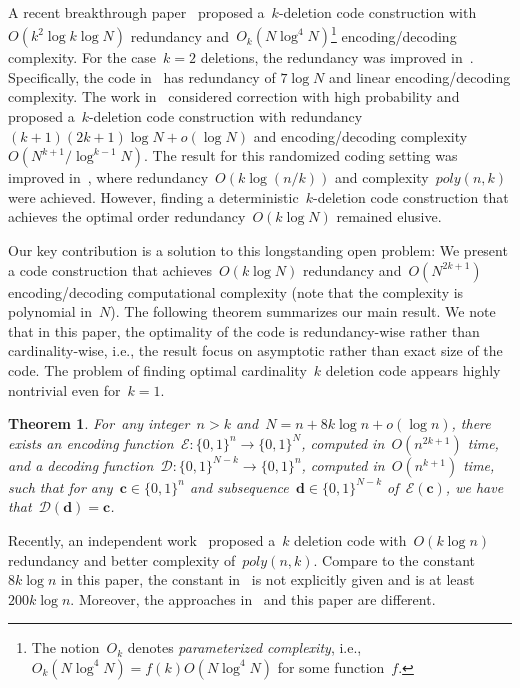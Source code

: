 \documentclass[10pt,a4paper,onecolumn]{IEEEtran}
\newtheorem{theorem}{Theorem}
\newcommand{\1}{\mathbbold{1}}
\newcommand{\boldc}{\mathbf{c}}
\newcommand{\boldd}{\mathbf{d}}
\begin{document}
A recent breakthrough paper~\cite{brakensiek2016efficient} proposed a~$k$-deletion code construction with~$O(k^2\log k \log N)$ redundancy and~$O_k(N\log^4 N)$\footnote{The notion~$O_k$ denotes \textit{parameterized complexity}, i.e., $O_k(N\log^4 N)=f(k)O(N\log^4 N)$ for some function~$f$.} encoding/decoding complexity. For the case~$k=2$ deletions, the redundancy was improved in~\cite{Ryan,sima2018two}. Specifically, the code in~\cite{sima2018two} has redundancy of $7\log N$ and linear encoding/decoding complexity. The work in~\cite{hanna2018guess} considered correction with high probability and proposed a~$k$-deletion code construction with redundancy~$(k+1)(2k+1)\log N + o(\log N)$ and encoding/decoding complexity~$O(N^{k+1}/\log^{k-1}N)$. The result for this randomized coding setting was improved in~\cite{Haeupler}, where redundancy~$O(k\log (n/k))$ and complexity~$poly(n,k)$ were achieved. However, finding a deterministic~$k$-deletion code construction that achieves the optimal order redundancy~$O(k\log N)$ remained elusive. 

Our key contribution is a solution to this longstanding open problem: We present a code construction that achieves~$O(k\log N)$ redundancy and~$O(N^{2k+1})$ encoding/decoding computational complexity (note that the complexity is polynomial in~$N$). 
The following theorem summarizes our main result. We note that in this paper, the optimality of the code is redundancy-wise rather than cardinality-wise, i.e., the result focus on asymptotic rather than exact size of the code. 
The problem of finding optimal cardinality~$k$ deletion code appears highly nontrivial even for~$k=1$.
\begin{theorem}\label{theorem:main}
    For~any integer~$n >k$ and~$N=n+8k\log n +o(\log n)$, there exists an encoding function~$\mathcal{E}:\{0,1\}^n\rightarrow \{0,1\}^{N}$, computed in~$O(n^{2k+1})$ time, and a decoding function~$\mathcal{D}:\{0,1\}^{N-k}\rightarrow \{0,1\}^{n}$, computed in~$O(n^{k+1})$ time, such that for any~$\boldc\in\{0,1\}^n$ and subsequence~$\boldd\in \{0,1\}^{N-k}$ of~$\mathcal{E}(\boldc)$, we have that~$\mathcal{D}(\boldd)=\boldc$. 
\end{theorem}
Recently, an independent work~\cite{kuan2018deterministic} proposed a~$k$ deletion code with~$O(k\log n)$ redundancy and better complexity of~$poly(n,k)$. Compare to the constant~$8k\log n$ in this paper, the constant in~\cite{kuan2018deterministic} is not explicitly given and is at least~$200k\log n$.
Moreover, the approaches in~\cite{kuan2018deterministic} and this paper are different. 
\end{document}
